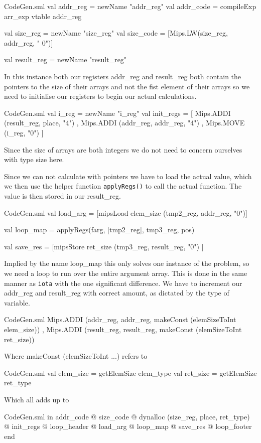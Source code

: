 \documentclass[11pt,a4paper,oneside]{report}
\begin{document}
\begin{code}[firstnumber=538]{CodeGen.sml}
        val addr_reg  = newName "addr_reg"
        val addr_code = compileExp arr_exp vtable addr_reg

        val size_reg  = newName "size_reg"
        val size_code = [Mips.LW(size_reg, addr_reg, " 0")]

        val result_reg = newName "result_reg"
\end{code}

In this instance both our registers addr\_reg and result\_reg both contain the pointers to the size of their arrays and not the fist element of their arrays so we need to initialise our registers to begin our actual calculations.
\begin{code}[firstnumber=546]{CodeGen.sml}
        val i_reg = newName "i_reg"
          val init_regs = [ Mips.ADDI (result_reg, place, "4")
                          , Mips.ADDI (addr_reg, addr_reg, "4")
                          , Mips.MOVE (i_reg, "0") ]
\end{code}

Since the size of arrays are both integers we do not need to concern ourselves with type size here.

Since we can not calculate with pointers we have to load the actual value, which we then use the helper function \texttt{applyRegs()} to call the actual function. The value is then stored in our result\_reg.
\begin{code}[firstnumber=561]{CodeGen.sml}
        val load_arg = [mipsLoad elem_size (tmp2_reg, addr_reg, "0")]

        val loop_map = applyRegs(farg, [tmp2_reg], tmp3_reg, pos)

        val save_res = [mipsStore ret_size (tmp3_reg, result_reg, "0") ]
\end{code}
Implied by the name loop\_map this only solves one instance of the problem, so we need a loop to run over the entire argument array. This is done in the same manner as \texttt{iota} with the one significant difference. We have to increment our addr\_reg and result\_reg with correct amount, as dictated by the type of variable.

\begin{code}[firstnumber=567]{CodeGen.sml}
  Mips.ADDI (addr_reg, addr_reg, makeConst (elemSizeToInt elem_size))
, Mips.ADDI (result_reg, result_reg, makeConst (elemSizeToInt ret_size))
\end{code}
Where makeConst (elemSizeToInt ...) refers to
\begin{code}[firstnumber=535]{CodeGen.sml}
val elem_size = getElemSize elem_type
val ret_size  = getElemSize ret_type
\end{code}
Which all adds up to
\begin{code}[firstnumber=573]{CodeGen.sml}
in addr_code
          @ size_code
          @ dynalloc (size_reg, place, ret_type)
          @ init_regs
          @ loop_header
          @ load_arg
          @ loop_map
          @ save_res
          @ loop_footer
        end
\end{code}
\end{document}
